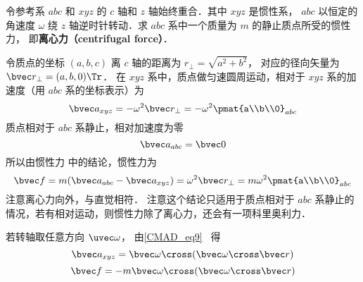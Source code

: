 
令参考系 $abc$ 和 $xyz$ 的 $c$ 轴和 $z$ 轴始终重合．其中 $xyz$ 是惯性系， $abc$ 以恒定的角速度 $\omega$ 绕 $z$ 轴逆时针转动．求 $abc$ 系中一个质量为 $m$ 的静止质点所受的惯性力， 即\textbf{离心力（centrifugal force）}．

令质点的坐标 $(a,b,c)$ 离 $c$ 轴的距离为 $r_\bot = \sqrt{a^2 + b^2}$， 对应的径向矢量为 $\bvec r_\bot = (a,b,0)\Tr$． 在 $xyz$ 系中，质点做匀速圆周运动，相对于 $xyz$ 系的加速度（用 $abc$ 系的坐标表示）为
\begin{equation}
\bvec a_{xyz} =  - \omega ^2 \bvec r_\bot =  - \omega ^2 \pmat{a\\b\\0}_{abc}
\end{equation}
质点相对于 $abc$ 系静止，相对加速度为零
\begin{equation}
\bvec a_{abc} = \bvec 0
\end{equation}
所以由惯性力 中的结论，惯性力为
\begin{equation}\label{Centri_eq3}
\bvec f = m(\bvec a_{abc} - \bvec a_{xyz}) = \omega^2\bvec r_\bot = m\omega ^2\pmat{a\\b\\0}_{abc}
\end{equation}
注意离心力向外，与直觉相符． 注意这个结论只适用于质点相对于 $abc$ 系静止的情况，若有相对运动，则惯性力除了离心力，还会有一项科里奥利力．

若转轴取任意方向 $\uvec\omega$， 由\autoref{CMAD_eq9}~ 得
\begin{equation}
\bvec a_{xyz} = \bvec\omega\cross (\bvec\omega\cross\bvec r)
\end{equation}
\begin{equation}\label{Centri_eq5}
\bvec f = -m\bvec\omega\cross (\bvec\omega\cross\bvec r)
\end{equation}
